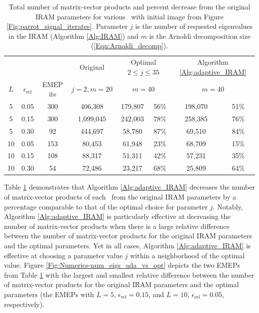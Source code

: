 \begin{table}[H]
\centering
\begin{tabular}{ |ccc|c|cc|cc| }
 \hline
			&&&  Original
			&  \multicolumn{2}{c|}{Optimal $2 \leq j \leq 35$}
			&	\multicolumn{2}{c|}{Algorithm \ref{Alg:adaptive_IRAM}}	\\
$L$ & $\epsilon_\text{rel}$ & EMEP its & $j=2, m=20$	& \multicolumn{2}{c|}{$m=40$}  & \multicolumn{2}{c|}{$m=40$}   \\
 \hline
 5 &  0.05 & 300 &  406,308  &  179,807 & 56\% &  198,070 & 51\% \\ 
  5 &  0.15 & 300 & 1,099,045  &  242,003 & 78\% &  258,385 & 76\% \\ 
  5 &  0.30 &  92 &  444,697  &   58,780 & 87\% &   69,510 & 84\% \\ 
 10 &  0.05 & 153 &   80,453  &   61,948 & 23\% &   68,709 & 15\% \\ 
 10 &  0.15 & 108 &   88,317  &   51,311 & 42\% &   57,231 & 35\% \\ 
 10 &  0.30 &  54 &   72,486  &   23,217 & 68\% &   25,809 & 64\% \\ 
 \hline
\end{tabular}

\caption{Total number of matrix-vector products and percent decrease from the original IRAM parameters for various \emeps \ with initial image from Figure \ref{Fig:parrot_signal_iterates}.  Parameter $j$ is the number of requested eigenvalues in the IRAM (Algorithm \ref{Alg:IRAM}) and $m$ is the Arnoldi decomposition size (\ref{Eqn:Arnoldi_decomp}).} \label{Tab:Numerics-num_matvecs_opt_vs_ada}
\end{table}

Table \ref{Tab:Numerics-num_matvecs_opt_vs_ada} demonstrates that Algorithm \ref{Alg:adaptive_IRAM} decreases the number of matrix-vector products of each \emep \ from the original IRAM parameters by a percentage comparable to that of the optimal choice for parameter $j$.
Notably, Algorithm \ref{Alg:adaptive_IRAM} is particularly effective at decreasing the number of matrix-vector products when there is a large relative difference between the number of matrix-vector products for the original IRAM parameters and the optimal parameters.
Yet in all cases, Algorithm \ref{Alg:adaptive_IRAM} is effective at choosing a parameter value $j$ within a neighborhood of the optimal value.
Figure \ref{Fig:Numerics-num_eigs_ada_vs_opt} depicts the two EMEPs from Table \ref{Tab:Numerics-num_matvecs_opt_vs_ada} with the largest and smallest relative difference between the number of matrix-vector products for the original IRAM parameters and the optimal parameters (the EMEPs with $L=5$, $\epsilon_\text{rel} = 0.15$, and $L=10$, $\epsilon_\text{rel} = 0.05$, respectively).



